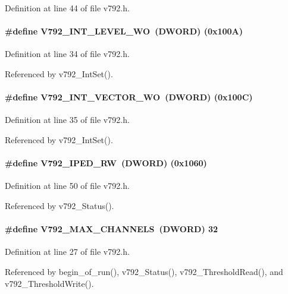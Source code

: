 Definition at line 44 of file v792.h.
\paragraph[{V792\_\-INT\_\-LEVEL\_\-WO}]{\setlength{\rightskip}{0pt plus 5cm}\#define V792\_\-INT\_\-LEVEL\_\-WO~({\bf DWORD}) (0x100A)}\hfill\label{v792_8h_a4baafd051ec82764c2a8032ffa02020c}


Definition at line 34 of file v792.h.

Referenced by v792\_\-IntSet().
\paragraph[{V792\_\-INT\_\-VECTOR\_\-WO}]{\setlength{\rightskip}{0pt plus 5cm}\#define V792\_\-INT\_\-VECTOR\_\-WO~({\bf DWORD}) (0x100C)}\hfill\label{v792_8h_a400219380629de17a139cd38ff2025d6}


Definition at line 35 of file v792.h.

Referenced by v792\_\-IntSet().
\paragraph[{V792\_\-IPED\_\-RW}]{\setlength{\rightskip}{0pt plus 5cm}\#define V792\_\-IPED\_\-RW~({\bf DWORD}) (0x1060)}\hfill\label{v792_8h_af9c1d13aeadbfdb136132c4cd696d14e}


Definition at line 50 of file v792.h.

Referenced by v792\_\-Status().
\paragraph[{V792\_\-MAX\_\-CHANNELS}]{\setlength{\rightskip}{0pt plus 5cm}\#define V792\_\-MAX\_\-CHANNELS~({\bf DWORD}) 32}\hfill\label{v792_8h_a7d8310a20d773e8c3de4549c81a5c7ae}


Definition at line 27 of file v792.h.

Referenced by begin\_\-of\_\-run(), v792\_\-Status(), v792\_\-ThresholdRead(), and v792\_\-ThresholdWrite().
